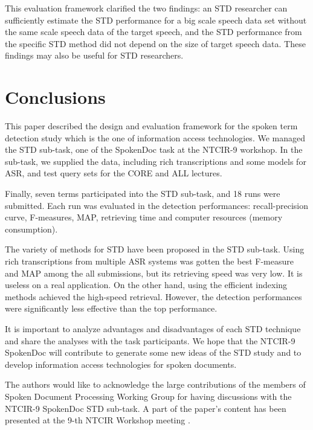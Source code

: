 \documentclass[english]{jnlp_1.4}
\begin{document}
This evaluation framework clarified the two findings: an STD researcher 
can sufficiently estimate the STD performance for a big scale speech 
data set without the same scale speech data of the target speech, and 
the STD performance from the specific STD method did not depend on the 
size of target speech data. These findings may also be useful for STD 
researchers.



\section{Conclusions}

This paper described the design and evaluation framework for the spoken
term detection study which is the one of information access technologies. 
We managed the STD sub-task, one of the SpokenDoc task at the NTCIR-9
workshop.
In the sub-task, we supplied the data, including rich transcriptions and
some models for ASR, and test query sets for the CORE and ALL lectures. 

Finally, seven terms participated into the STD sub-task, and 18 runs
were submitted. Each run was evaluated in the detection performances:
recall-precision curve, F-measures, MAP, \mbox{retrieving} time and computer
resources (memory consumption). 

The variety of methods for STD have been proposed in the STD
sub-task. Using rich transcriptions from multiple ASR systems \cite{ALPS}
was gotten the best F-measure and MAP among the all submissions, but its
retrieving speed was very low. It is useless on a real application. 
On the other hand, using the efficient indexing methods \cite{NKGW,NKI11}
achieved the high-speed retrieval. However, the detection performances
were significantly less effective than the top performance.

It is important to analyze advantages and disadvantages of each STD
technique and share the analyses with the task participants. 
We hope that the NTCIR-9 SpokenDoc will contribute to generate some new
ideas of the STD study and to develop information access technologies
for spoken documents. 


\acknowledgment

The authors would like to acknowledge the large contributions of 
the members of Spoken Document Processing Working Group for 
having discussions with the NTCIR-9 SpokenDoc STD sub-task.
A part of the paper's content has been presented at the 
9-th NTCIR Workshop meeting \cite{NTCIR9SpokenDoc}.
\end{document}
